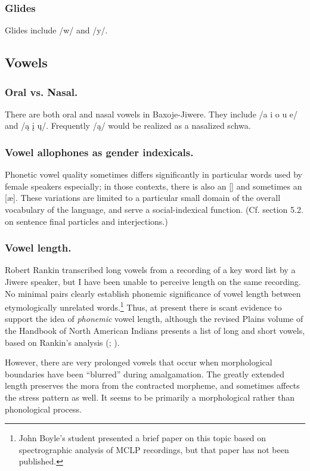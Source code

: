 \documentclass[output=paper]{LSP/langsci}
\begin{document}
\subsubsection{Glides} Glides include /w/ and /y/.  

\subsection{Vowels} 										      	         	          
\subsubsection{Oral vs. Nasal.}  There are both oral and nasal vowels in Baxoje-Jiwere.   They include /a i o u e/ and /\k{a} \k{i} \k{u}/. Frequently /\k{a}/ would be realized as a nasalized schwa. 

\subsubsection{Vowel allophones as gender indexicals.}  Phonetic vowel quality sometimes differs significantly in particular words used by female speakers especially; in those contexts, there is also an [] and sometimes an [\ae].  These variations are limited to a particular small domain of the overall vocabulary of the language, and serve a social-indexical function. (Cf. section 5.2. on sentence final particles and interjections.)   

\subsubsection{Vowel length.}  Robert Rankin transcribed long vowels from a recording of a key word list by a Jiwere speaker, but I have been unable to perceive length on the same recording. No minimal pairs clearly establish phonemic significance of vowel length between etymologically unrelated words.\footnote{John Boyle's student presented a brief paper on this topic based on spectrographic analysis of MCLP recordings, but that paper has not been published.}  Thus, at present there is scant evidence to support the idea of \textit{phonemic} vowel length, although the revised Plains volume of the Handbook of North American Indians presents a list of long and short vowels, based on Rankin's analysis (\citealt[432]{Wedel1996}; \citealt[447]{Schweitzer1996}).       	         

However, there are very prolonged vowels that occur when morphological boundaries have been ``blurred'' during amalgamation.  The greatly extended length preserves the mora from the contracted morpheme, and sometimes affects the stress pattern as well.  It seems to be primarily a morphological rather than phonological process.  
\end{document}
